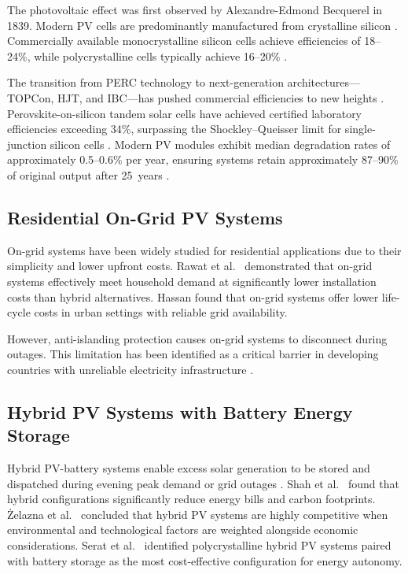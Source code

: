 The photovoltaic effect was first observed by Alexandre-Edmond Becquerel in 1839. Modern PV cells are predominantly manufactured from crystalline silicon \cite{green2022}. Commercially available monocrystalline silicon cells achieve efficiencies of 18--24\%, while polycrystalline cells typically achieve 16--20\% \cite{parida2011,nrel2024}.

The transition from PERC technology to next-generation architectures---TOPCon, HJT, and IBC---has pushed commercial efficiencies to new heights \cite{longi2024}. Perovskite-on-silicon tandem solar cells have achieved certified laboratory efficiencies exceeding 34\%, surpassing the Shockley--Queisser limit for single-junction silicon cells \cite{longi2024,pvmag2024}. Modern PV modules exhibit median degradation rates of approximately 0.5--0.6\% per year, ensuring systems retain approximately 87--90\% of original output after 25~years \cite{nrel2023,jordan2013}.


\subsection{Residential On-Grid PV Systems}

On-grid systems have been widely studied for residential applications due to their simplicity and lower upfront costs. Rawat et al.\ \cite{rawat2024} demonstrated that on-grid systems effectively meet household demand at significantly lower installation costs than hybrid alternatives. Hassan \cite{hassan2021} found that on-grid systems offer lower life-cycle costs in urban settings with reliable grid availability.

However, anti-islanding protection causes on-grid systems to disconnect during outages. This limitation has been identified as a critical barrier in developing countries with unreliable electricity infrastructure \cite{walker2013,zelazna2020}.


\subsection{Hybrid PV Systems with Battery Energy Storage}

Hybrid PV-battery systems enable excess solar generation to be stored and dispatched during evening peak demand or grid outages \cite{zakeri2015}. Shah et al.\ \cite{shah2015} found that hybrid configurations significantly reduce energy bills and carbon footprints. \.{Z}elazna et al.\ \cite{zelazna2020} concluded that hybrid PV systems are highly competitive when environmental and technological factors are weighted alongside economic considerations. Serat et al.\ \cite{serat2024} identified polycrystalline hybrid PV systems paired with battery storage as the most cost-effective configuration for energy autonomy.

